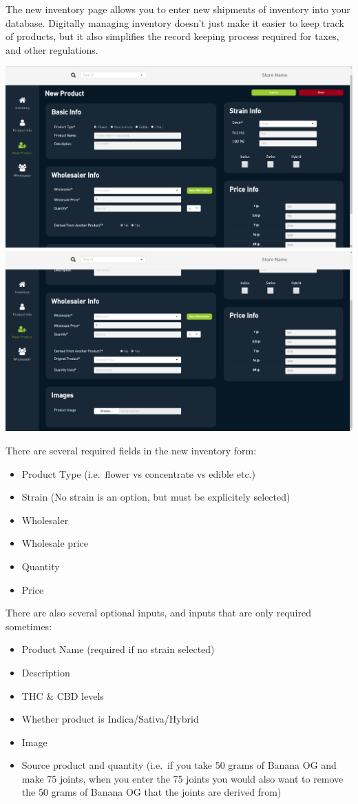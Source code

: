 \documentclass[]{book}
\theoremstyle{definition}
\theoremstyle{definition}
\theoremstyle{definition}
\theoremstyle{remark}
\begin{document}
The new inventory page allows you to enter new shipments of inventory
into your database. Digitally managing inventory doesn't just make it
easier to keep track of products, but it also simplifies the record
keeping process required for taxes, and other regulations.

\includegraphics{images/I1.png} \includegraphics{images/I2.png}

There are several required fields in the new inventory form:

\begin{itemize}
\item
  Product Type (i.e.~flower vs concentrate vs edible etc.)
\item
  Strain (No strain is an option, but must be explicitely selected)
\item
  Wholesaler
\item
  Wholesale price
\item
  Quantity
\item
  Price
\end{itemize}

There are also several optional inputs, and inputs that are only
required sometimes:

\begin{itemize}
\item
  Product Name (required if no strain selected)
\item
  Description
\item
  THC \& CBD levels
\item
  Whether product is Indica/Sativa/Hybrid
\item
  Image
\item
  Source product and quantity (i.e.~if you take 50 grams of Banana OG
  and make 75 joints, when you enter the 75 joints you would also want
  to remove the 50 grams of Banana OG that the joints are derived from)
\end{itemize}
\end{document}
